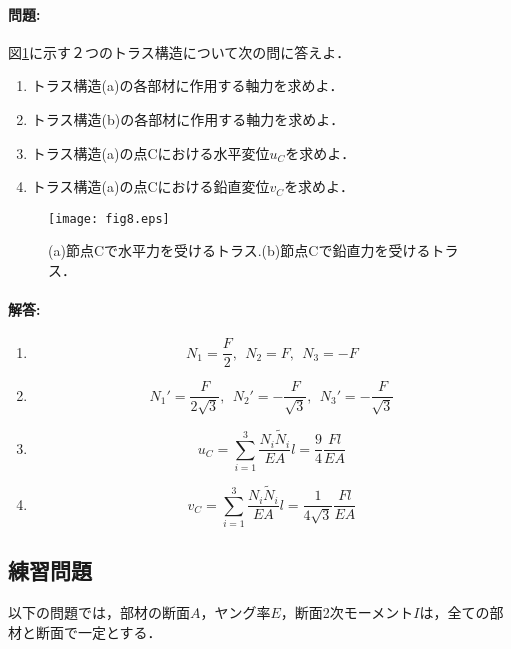 \documentclass[10pt,a4j]{jarticle}
\begin{document}
\paragraph{問題:}
図\ref{fig:fig8}に示す２つのトラス構造について次の問に答えよ．
\begin{enumerate}
\item
	トラス構造(a)の各部材に作用する軸力を求めよ．
\item
	トラス構造(b)の各部材に作用する軸力を求めよ．
\item
	トラス構造(a)の点Cにおける水平変位$u_C$を求めよ．
\item
	トラス構造(a)の点Cにおける鉛直変位$v_C$を求めよ．
\end{enumerate}
\begin{figure}
	\begin{center}
	\texttt{[image: fig8.eps]} 
	\end{center}
	\caption{(a)節点Cで水平力を受けるトラス.(b)節点Cで鉛直力を受けるトラス．}
	\label{fig:fig8}
\end{figure}
\paragraph{解答:}
\begin{enumerate}
\item
\begin{equation}
	N_1=\frac{F}{2}, \ \ N_2=F, \ \ N_3=-F 
	\label{eqn:}
\end{equation}
\item
\begin{equation}
	N_1'=\frac{F}{2\sqrt{3}}, \ \ N_2'=-\frac{F}{\sqrt{3}}, \ \ N_3'=- \frac{F}{\sqrt{3}}
	\label{eqn:}
\end{equation}
\item
\begin{equation}
	u_C=\sum_{i=1}^3 \frac{N_i\tilde N_i}{EA}l=\frac{9}{4}\frac{Fl}{EA}
\end{equation}
\item
\begin{equation}
	v_C=\sum_{i=1}^3 \frac{N_i\tilde N_i}{EA}l=\frac{1}{4\sqrt{3}}\frac{Fl}{EA}
\end{equation}
\end{enumerate}
\subsection{練習問題}
以下の問題では，部材の断面$A$，ヤング率$E$，断面2次モーメント$I$は，全ての部材と断面で一定とする．
\end{document}
